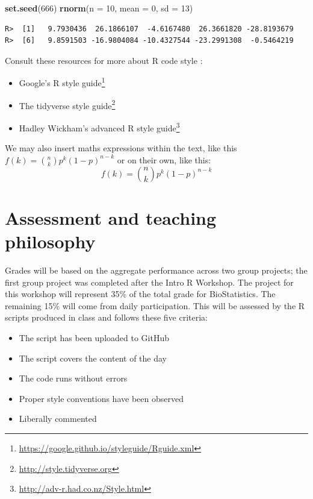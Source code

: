 \documentclass[english,10pt,a4paper,oneside]{book}
\renewcommand{\href}[2]{#2\footnote{\url{#1}}}
\let\rmarkdownfootnote\footnote%
\def\footnote{\protect\rmarkdownfootnote}
\providecommand{\tightlist}{%
  \setlength{\itemsep}{0pt}\setlength{\parskip}{0pt}}
\newenvironment{Shaded}{\begin{snugshade}}{\end{snugshade}}
\newcommand{\KeywordTok}[1]{\textcolor[rgb]{0.13,0.29,0.53}{\textbf{#1}}}
\newcommand{\DataTypeTok}[1]{\textcolor[rgb]{0.13,0.29,0.53}{#1}}
\newcommand{\DecValTok}[1]{\textcolor[rgb]{0.00,0.00,0.81}{#1}}
\newcommand{\NormalTok}[1]{#1}
\theoremstyle{definition}
\theoremstyle{definition}
\theoremstyle{definition}
\theoremstyle{remark}
\begin{document}
\begin{Shaded}
\begin{Highlighting}[]
\KeywordTok{set.seed}\NormalTok{(}\DecValTok{666}\NormalTok{)}
\KeywordTok{rnorm}\NormalTok{(}\DataTypeTok{n =} \DecValTok{10}\NormalTok{, }\DataTypeTok{mean =} \DecValTok{0}\NormalTok{, }\DataTypeTok{sd =} \DecValTok{13}\NormalTok{)}
\end{Highlighting}
\end{Shaded}

\begin{verbatim}
R>  [1]   9.7930436  26.1866107  -4.6167480  26.3661820 -28.8193679
R>  [6]   9.8591503 -16.9804084 -10.4327544 -23.2991308  -0.5464219
\end{verbatim}

Consult these resources for more about R code style :

\begin{itemize}
\tightlist
\item
  \href{https://google.github.io/styleguide/Rguide.xml}{Google's R style
  guide}
\item
  \href{http://style.tidyverse.org}{The tidyverse style guide}
\item
  \href{http://adv-r.had.co.nz/Style.html}{Hadley Wickham's advanced R
  style guide}
\end{itemize}

We may also insert maths expressions within the text, like this
\(f(k) = {n \choose k} p^{k} (1-p)^{n-k}\) or on their own, like this:
\[f(k) = {n \choose k} p^{k} (1-p)^{n-k}\]

\section{Assessment and teaching
philosophy}\label{assessment-and-teaching-philosophy}

Grades will be based on the aggregate performance across two group
projects; the first group project was completed after the Intro R
Workshop. The project for this workshop will represent 35\% of the total
grade for BioStatistics. The remaining 15\% will come from daily
participation. This will be assessed by the R scripts produced in class
and follows these five criteria:

\begin{itemize}
\tightlist
\item
  The script has been uploaded to GitHub
\item
  The script covers the content of the day
\item
  The code runs without errors
\item
  Proper style conventions have been observed
\item
  Liberally commented
\end{itemize}
\end{document}
